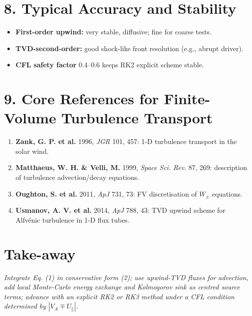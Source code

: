 \hrulefill

\section*{8. Typical Accuracy and Stability}

\begin{itemize}
    \item \textbf{First-order upwind:} very stable, diffusive; fine for coarse tests.
    \item \textbf{TVD-second-order:} good shock-like front resolution (e.g., abrupt driver).
    \item \textbf{CFL safety factor} 0.4–0.6 keeps RK2 explicit scheme stable.
\end{itemize}

\hrulefill

\section*{9. Core References for Finite-Volume Turbulence Transport}

\begin{enumerate}
    \item \textbf{Zank, G. P. et al.} 1996, \textit{JGR} 101, 457: 1-D turbulence transport in the solar wind.
    \item \textbf{Matthaeus, W. H. \& Velli, M.} 1999, \textit{Space Sci. Rev.} 87, 269: description of turbulence advection/decay equations.
    \item \textbf{Oughton, S. et al.} 2011, \textit{ApJ} 731, 73: FV discretisation of $W_\pm$ equations.
    \item \textbf{Usmanov, A. V. et al.} 2014, \textit{ApJ} 788, 43: TVD upwind scheme for Alfvénic turbulence in 1-D flux tubes.
\end{enumerate}

\hrulefill

\section*{Take-away}

\textit{Integrate Eq. (1) in conservative form (2); use upwind-TVD fluxes for advection, add local Monte-Carlo energy exchange and Kolmogorov sink as centred source terms; advance with an explicit RK2 or RK3 method under a CFL condition determined by $|V_A \mp U_\parallel|$.}
